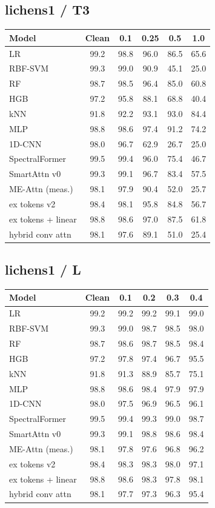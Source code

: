 \subsection*{lichens1 / T3}
\small
\begin{tabular}{lccccc}
\toprule
Model & Clean & 0.1 & 0.25 & 0.5 & 1.0 \\
\midrule
LR & 99.2 & 98.8 & 96.0 & 86.5 & 65.6 \\
RBF-SVM & 99.3 & 99.0 & 90.9 & 45.1 & 25.0 \\
RF & 98.7 & 98.5 & 96.4 & 85.0 & 60.8 \\
HGB & 97.2 & 95.8 & 88.1 & 68.8 & 40.4 \\
kNN & 91.8 & 92.2 & 93.1 & 93.0 & 84.4 \\
MLP & 98.8 & 98.6 & 97.4 & 91.2 & 74.2 \\
1D-CNN & 98.0 & 96.7 & 62.9 & 26.7 & 25.0 \\
SpectralFormer & 99.5 & 99.4 & 96.0 & 75.4 & 46.7 \\
SmartAttn v0 & 99.3 & 99.1 & 96.7 & 83.4 & 57.5 \\
ME-Attn (meas.) & 98.1 & 97.9 & 90.4 & 52.0 & 25.7 \\
ex tokens v2 & 98.4 & 98.1 & 95.8 & 84.8 & 56.7 \\
ex tokens + linear & 98.8 & 98.6 & 97.0 & 87.5 & 61.8 \\
hybrid conv attn & 98.1 & 97.6 & 89.1 & 51.0 & 25.4 \\
\bottomrule
\end{tabular}

\subsection*{lichens1 / L}
\small
\begin{tabular}{lccccc}
\toprule
Model & Clean & 0.1 & 0.2 & 0.3 & 0.4 \\
\midrule
LR & 99.2 & 99.2 & 99.2 & 99.1 & 99.0 \\
RBF-SVM & 99.3 & 99.0 & 98.7 & 98.5 & 98.0 \\
RF & 98.7 & 98.6 & 98.7 & 98.5 & 98.4 \\
HGB & 97.2 & 97.8 & 97.4 & 96.7 & 95.5 \\
kNN & 91.8 & 91.3 & 88.9 & 85.7 & 75.1 \\
MLP & 98.8 & 98.6 & 98.4 & 97.9 & 97.9 \\
1D-CNN & 98.0 & 97.5 & 96.9 & 96.5 & 96.1 \\
SpectralFormer & 99.5 & 99.4 & 99.3 & 99.0 & 98.7 \\
SmartAttn v0 & 99.3 & 99.1 & 98.8 & 98.6 & 98.4 \\
ME-Attn (meas.) & 98.1 & 97.8 & 97.6 & 96.8 & 96.2 \\
ex tokens v2 & 98.4 & 98.3 & 98.3 & 98.0 & 97.1 \\
ex tokens + linear & 98.8 & 98.6 & 98.3 & 97.8 & 98.1 \\
hybrid conv attn & 98.1 & 97.7 & 97.3 & 96.3 & 95.4 \\
\bottomrule
\end{tabular}

